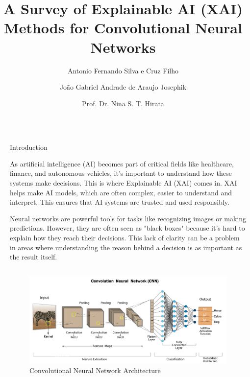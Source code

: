 \documentclass[final]{beamer}
\title{\huge A Survey of Explainable AI (XAI) Methods for Convolutional Neural Networks}
\author{\large Antonio Fernando Silva e Cruz Filho \inst{1} \and João Gabriel Andrade de Araujo Josephik\inst{1} \and Prof. Dr. Nina S. T. Hirata}
\institute[shortinst]{\inst{1} Institute of Mathematics and Statistics}
\newlength{\sepwidth}
\newlength{\colwidth}
\newcommand{\separatorcolumn}{\begin{column}{\sepwidth}\end{column}}
\begin{document}



\begin{frame}[t]
\begin{columns}[t]
\separatorcolumn

\begin{column}{\colwidth}

  \begin{block}{Introduction}

    As artificial intelligence (AI) becomes part of critical fields like healthcare, finance, and autonomous vehicles, it’s important to understand how these systems make decisions. This is where Explainable AI (XAI) comes in. XAI helps make AI models, which are often complex, easier to understand and interpret. This ensures that AI systems are trusted and used responsibly.

    Neural networks are powerful tools for tasks like recognizing images or making predictions. However, they are often seen as "black boxes" because it’s hard to explain how they reach their decisions. This lack of clarity can be a problem in areas where understanding the reason behind a decision is as important as the result itself.
    \begin{columns}
      
      \begin{column}{0.6\textwidth}
        \begin{figure}
          \centering
          \includegraphics[width=\linewidth]{images/cnns.png}
          \caption{Convolutional Neural Network Architecture}
        \end{figure}
      \end{column}


\end{columns}
\end{block}
\end{column}
\end{columns}
\end{frame}
\end{document}

